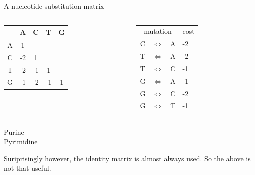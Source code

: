 \documentclass[pdf]{beamer}
\begin{document}
\begin{frame}{A nucleotide substitution matrix}
  \begin{columns}[t]
    \begin{column}{0.5\textwidth}
      \begin{tabular}{ c| c c c c }
        & \textcolor{pur}{A} & \textcolor{pyr}{C} & \textcolor{pyr}{T} & \textcolor{pur}{G}\\
        \hline
        \textcolor{pur}{A} & 1 \\
        \textcolor{pyr}{C} & -2& 1 \\
        \textcolor{pyr}{T} & -2& -1& 1\\
        \textcolor{pur}{G} & -1& -2& -1& 1\\
      \end{tabular}
    \end{column}
    \begin{column}{0.5\textwidth}
      \begin{tabular}{ c c c l }
        \multicolumn{3}{c}{mutation} & cost \\
        \textcolor{pyr}{C} & $\Leftrightarrow$ & \textcolor{pur}{A} & -2 \\
        \textcolor{pyr}{T} & $\Leftrightarrow$ & \textcolor{pur}{A} & -2 \\
        \textcolor{pyr}{T} & $\Leftrightarrow$ & \textcolor{pyr}{C} & -1 \\
        \textcolor{pur}{G} & $\Leftrightarrow$ & \textcolor{pur}{A} & -1 \\
        \textcolor{pur}{G} & $\Leftrightarrow$ & \textcolor{pyr}{C} & -2 \\
        \textcolor{pur}{G} & $\Leftrightarrow$ & \textcolor{pyr}{T} & -1 \\
      \end{tabular}
    \end{column}
  \end{columns}
  \textcolor{pur}{Purine}\\
  \textcolor{pyr}{Pyrimidine}

  Suriprisingly however, the identity matrix is almost always used. So the
  above is not that useful.
\end{frame}
\end{document}
